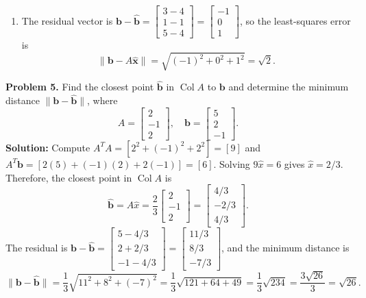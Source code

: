\documentclass[11pt, letterpaper]{article}
\theoremstyle{definition}
\theoremstyle{remark}
\begin{document}
\begin{enumerate}[label=(\alph*)]
\[    \]
    \item The residual vector is $\mathbf{b} - \hat{\mathbf{b}} = \begin{bmatrix} 3-4 \\ 1-1 \\ 5-4 \end{bmatrix} = \begin{bmatrix} -1 \\ 0 \\ 1 \end{bmatrix}$, so the least-squares error is
    \[
    \|\mathbf{b} - A\hat{\mathbf{x}}\| = \sqrt{(-1)^2 + 0^2 + 1^2} = \sqrt{2}.
    \]
\end{enumerate}

\textbf{Problem 5.} Find the closest point $\hat{\mathbf{b}}$ in $\operatorname{Col} A$ to $\mathbf{b}$ and determine the minimum distance $\|\mathbf{b} - \hat{\mathbf{b}}\|$, where
\[
A = \begin{bmatrix} 2 \\ -1 \\ 2 \end{bmatrix}, \quad \mathbf{b} = \begin{bmatrix} 5 \\ 2 \\ -1 \end{bmatrix}.
\]
\textbf{Solution:} Compute $A^T A = [2^2 + (-1)^2 + 2^2] = [9]$ and $A^T \mathbf{b} = [2(5) + (-1)(2) + 2(-1)] = [6]$. Solving $9\hat{x} = 6$ gives $\hat{x} = 2/3$. Therefore, the closest point in $\operatorname{Col} A$ is
\[
\hat{\mathbf{b}} = A\hat{x} = \frac{2}{3} \begin{bmatrix} 2 \\ -1 \\ 2 \end{bmatrix} = \begin{bmatrix} 4/3 \\ -2/3 \\ 4/3 \end{bmatrix}.
\]
The residual is $\mathbf{b} - \hat{\mathbf{b}} = \begin{bmatrix} 5 - 4/3 \\ 2 + 2/3 \\ -1 - 4/3 \end{bmatrix} = \begin{bmatrix} 11/3 \\ 8/3 \\ -7/3 \end{bmatrix}$, and the minimum distance is
\[
\|\mathbf{b} - \hat{\mathbf{b}}\| = \frac{1}{3} \sqrt{11^2 + 8^2 + (-7)^2} = \frac{1}{3} \sqrt{121 + 64 + 49} = \frac{1}{3}\sqrt{234} = \frac{3\sqrt{26}}{3} = \sqrt{26}.
\]
\end{document}
